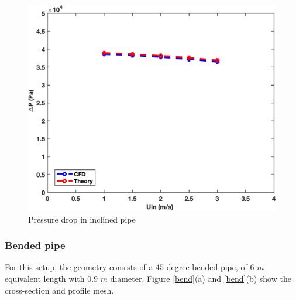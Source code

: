 \documentclass[11pt]{report}
\begin{document}
%
 \begin{figure}[ht!]
 \begin{center}
 \includegraphics[scale = 0.45]{figs/inclined.png}
 \caption{ Pressure drop in inclined pipe}
 \label{inclin}
 \end{center}
 \end{figure}


%
 \subsubsection{Bended pipe}\label{bended}
 For this setup, the geometry consists of a $45$ degree bended pipe, of 6 $m$ equivalent length with 0.9 $m$ diameter. Figure \ref{bend}(a) and \ref{bend}(b) show the cross-section and profile mesh.
\end{document}

